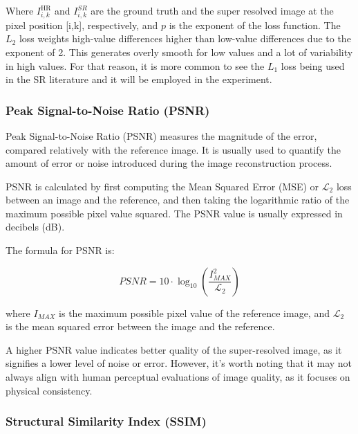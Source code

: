            Where $I^{\text{HR}}_{i,k}$ and $I^{SR}_{i,k}$ are the ground truth and the super resolved image at the pixel position [i,k], respectively, and $p$ is the exponent of the loss function. 
            The $L_2$ loss weights high-value differences higher than low-value differences due to the exponent of 2. 
            This generates overly smooth for low values and a lot of variability in high values. 
            For that reason, it is more common to see the $L_1$ loss being used in the SR literature and it will be employed in the experiment.

        \subsubsection{Peak Signal-to-Noise Ratio (PSNR)}

         
            Peak Signal-to-Noise Ratio (PSNR) measures the magnitude of the error, compared relatively with the reference image. It is usually used to quantify the amount of error or noise introduced during the image reconstruction process.
            
            PSNR is calculated by first computing the Mean Squared Error (MSE) or $\mathcal{L}_2$ loss between an image and the reference, and then taking the logarithmic ratio of the maximum possible pixel value squared. The PSNR value is usually expressed in decibels (dB).
            
            The formula for PSNR is:
            
            \begin{equation}
            PSNR = 10 \cdot \log_{10} \left( \frac{I_{MAX}^{2}}{\mathcal{L}_2} \right)
            \end{equation}
            
            where $I_{MAX}$ is the maximum possible pixel value of the reference image, and $\mathcal{L}_2$ is the mean squared error between the image and the reference.
            
            A higher PSNR value indicates better quality of the super-resolved image, as it signifies a lower level of noise or error. However, it's worth noting that it may not always align with human perceptual evaluations of image quality, as it focuses on physical consistency.

        \subsubsection{Structural Similarity Index (SSIM)}

